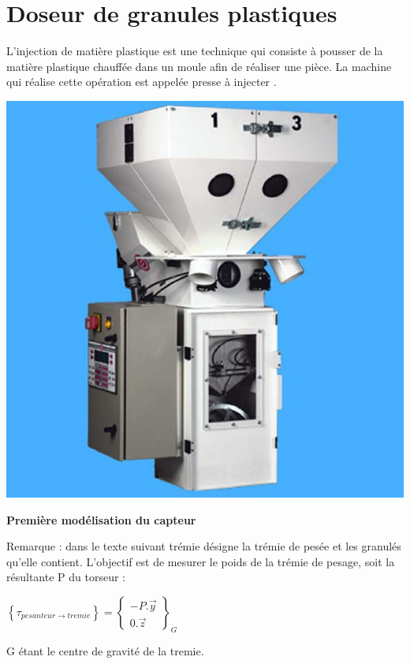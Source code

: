 \newpage

\section{Doseur de granules plastiques}

\begin{minipage}{0.6\linewidth}
L'injection de matière plastique est une technique qui consiste à pousser de la matière plastique chauffée dans un moule afin de réaliser une pièce. La machine qui réalise cette opération est appelée \og presse à injecter \fg.
\end{minipage}
\hfill
\begin{minipage}{0.37\linewidth}
\centering\includegraphics[width=0.8\linewidth]{img/doseur1.jpg}
\end{minipage}

\textbf{Première modélisation du capteur}

Remarque : dans le texte suivant \og trémie \fg désigne la trémie de pesée et les granulés qu'elle contient. L'objectif est de mesurer le poids de la trémie de pesage, soit la résultante P du torseur :

$\left\{\tau_{pesanteur \rightarrow tremie}\right\}=\left\{
\begin{array}{c}
-P.\overrightarrow{y} \\
0.\overrightarrow{z}
\end{array}\right\}_G$

G étant le centre de gravité de la tremie.

